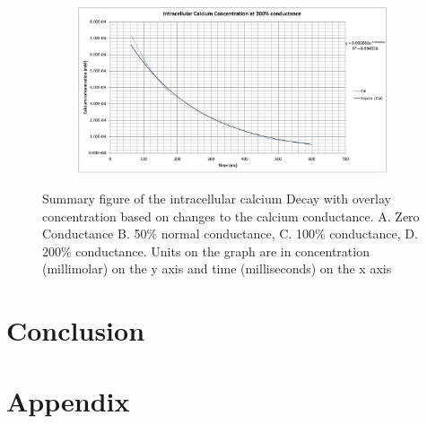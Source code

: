 \documentclass[11pt]{article}
\begin{document}
\begin{figure}[H]
\begin{subfigure}{0.45\textwidth}
		\caption{}
		\label{fig:left}
	\end{subfigure}
	\begin{subfigure}{0.45\textwidth}
		\centering
		\includegraphics[width = \textwidth]{figs/4.png}
		\caption{}
		\label{fig:right}
	\end{subfigure}
	\caption{Summary figure of the intracellular calcium Decay with overlay concentration based on changes to the calcium conductance. A. Zero Conductance B. 50\% normal conductance, C. 100\% conductance, D. 200\% conductance. Units on the graph are in concentration (millimolar) on the y axis and time (milliseconds) on the x axis}
	\label{fig:overlays}
\end{figure}


\section{Conclusion}


\section{Appendix} 





\end{document}

